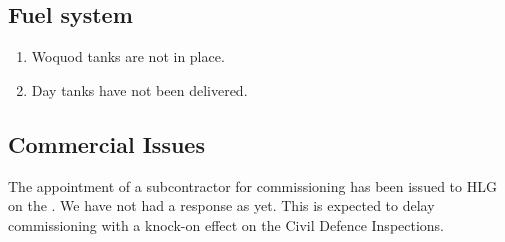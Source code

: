 \subsection{Fuel system}
\begin{enumerate}
\item Woquod tanks are not in place.
\item Day tanks have not been delivered.
\end{enumerate}
\subsection{Commercial Issues}

The appointment of a subcontractor for commissioning has been issued to HLG on the . We have not had a response as yet. This is expected to delay commissioning with a knock-on effect on the Civil Defence Inspections.



















